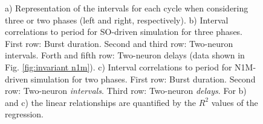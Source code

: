 \begin{figure}[hbt!]
\begin{minipage}[b]{0.45\textwidth}
\begin{minipage}[b]{\textwidth}
		\end{minipage}
	
		\vspace{50pt}
	\end{minipage}
	\caption{a) Representation of the intervals for each cycle when considering three or two phases (left and right, respectively). b) Interval correlations to period for SO-driven simulation for three phases. First row: Burst duration. Second and third row: Two-neuron intervals. Forth and fifth row: Two-neuron delays (data shown in Fig. \ref{fig:invariant n1m}). c) Interval correlations to period for N1M-driven simulation for two phases. First row: Burst duration. Second row: Two-neuron \textit{intervals}. Third row: Two-neuron \textit{delays}. For b) and c) the linear relationships are quantified by the $R^2$ values of the regression.}
	\label{fig:invariant n1m model 2 phases}
\end{figure}


\clearpage
\newpage
